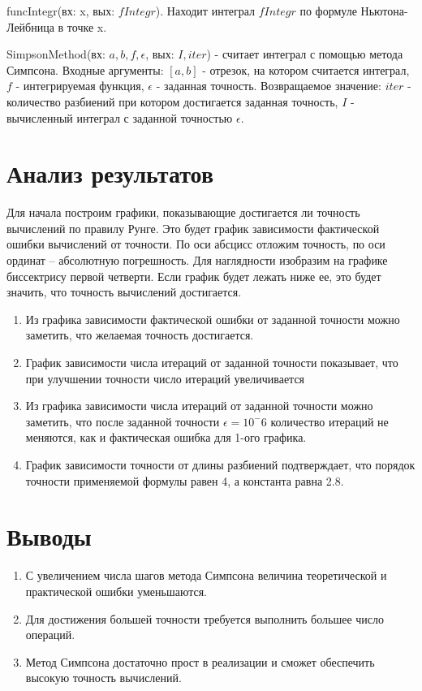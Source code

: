 \documentclass{article}
\begin{document}
	funcIntegr(вх: x, вых: $fIntegr$). Находит интеграл $fIntegr$
	по формуле Ньютона-Лейбница в точке x.

	
	SimpsonMethod(вх: $a, b, f, \epsilon$, вых: $I, iter$) - считает интеграл с помощью метода Симпсона. Входные аргументы: $[a,b]$ - отрезок, на котором считается интеграл, $f$ - интегрируемая функция, $\epsilon$ - заданная точность. Возвращаемое значение: $iter$ - количество разбиений при котором достигается заданная точность, $I$ - вычисленный интеграл с заданной точностью $\epsilon$.
	
	\section{Анализ результатов}
	Для начала построим графики, показывающие достигается ли точность вычислений по правилу Рунге.
	Это будет график зависимости фактической ошибки вычислений от точности.
	По оси абсцисс отложим точность, по оси ординат – абсолютную погрешность.
	Для наглядности изобразим на графике биссектрису первой четверти. Если график будет лежать ниже
	ее, это будет значить, что точность вычислений достигается.

	\begin{enumerate}
		\item Из графика зависимости фактической ошибки от заданной точности можно заметить, что желаемая точность достигается. 
		\item График зависимости числа итераций от заданной точности показывает, что при улучшении точности число итераций увеличивается
		\item Из графика зависимости числа итераций от заданной точности можно заметить, что после заданной точности $\epsilon = 10^-6$ количество итераций не меняются, как и фактическая ошибка для 1-ого графика.
		\item График зависимости точности от длины разбиений подтверждает, что порядок точности применяемой формулы равен 4, а константа равна 2.8.
	\end{enumerate}

	\section{Выводы}
	\begin{enumerate}
		\item С увеличением числа шагов метода Симпсона величина теоретической и практической ошибки уменьшаются.
		\item Для достижения большей точности требуется выполнить большее число операций.
		\item Метод Симпсона достаточно прост в реализации и сможет обеспечить высокую точность вычислений.
	\end{enumerate}
\end{document}
